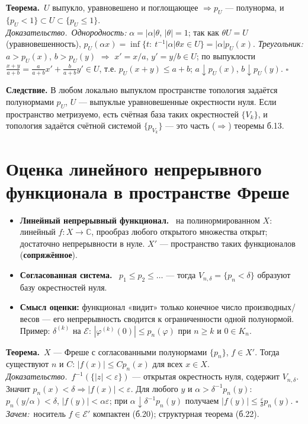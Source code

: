 \documentclass[11pt,a4paper]{article}
\newcommand{\CC}{\mathbb C}
\newcommand{\EE}{\mathcal E}
\newcommand{\df}[1]{\textbf{#1.}~}
\newcommand{\thm}{\textbf{Теорема.}~}
\newcommand{\pf}{\textit{Доказательство.}~}
\newcommand{\qedd}{\hfill$\square$}
\newcommand{\why}{\textit{Зачем:}~}
\begin{document}
\thm $U$ выпукло, уравновешено и поглощающее $\Rightarrow p_U$ — полунорма, и $\{p_U<1\}\subset U\subset\{p_U\le1\}$.\\
\pf \textit{Однородность:} $\alpha=|\alpha|\theta$, $|\theta|=1$; так как $\theta U=U$ (уравновешенность), $p_U(\alpha x)=\inf\{t:\ t^{-1}|\alpha|\theta x\in U\}=|\alpha|p_U(x)$. \textit{Треугольник:} $a>p_U(x)$, $b>p_U(y)$ $\Rightarrow$ $x'=x/a$, $y'=y/b\in U$; по выпуклости $\frac{x+y}{a+b}=\frac a{a+b}x'+\frac b{a+b}y'\in U$, т.е. $p_U(x+y)\le a+b$; $a\downarrow p_U(x)$, $b\downarrow p_U(y)$. \qedd

\textbf{Следствие.} В любом локально выпуклом пространстве топология задаётся полунормами $p_U$, $U$ — выпуклые уравновешенные окрестности нуля. Если пространство метризуемо, есть счётная база таких окрестностей $\{V_k\}$, и топология задаётся счётной системой $\{p_{V_k}\}$ — это часть ($\Rightarrow$) теоремы б.13.

\section{Оценка линейного непрерывного функционала в пространстве Фреше}
\begin{defs}
\begin{itemize}
\item \df{Линейный непрерывный функционал} на полинормированном $X$: линейный $f:X\to\CC$, прообраз любого открытого множества открыт; достаточно непрерывности в нуле. $X'$ — пространство таких функционалов (\textbf{сопряжённое}).
\item \df{Согласованная система} $p_1\le p_2\le\dots$ — тогда $V_{n,\delta}=\{p_n<\delta\}$ образуют базу окрестностей нуля.
\item \textbf{Смысл оценки:} функционал «видит» только конечное число производных/весов — его непрерывность сводится к ограниченности одной полунормой. Пример: $\delta^{(k)}$ на $\EE$: $|\varphi^{(k)}(0)|\le p_n(\varphi)$ при $n\ge k$ и $0\in K_n$.
\end{itemize}
\end{defs}

\thm $X$ — Фреше с согласованными полунормами $\{p_n\}$, $f\in X'$. Тогда существуют $n$ и $C$: $|f(x)|\le Cp_n(x)$ для всех $x\in X$.\\
\pf $f^{-1}(\{|z|<\varepsilon\})$ — открытая окрестность нуля, содержит $V_{n,\delta}$. Значит $p_n(x)<\delta\Rightarrow|f(x)|<\varepsilon$. Для любого $y$ и $\alpha>\delta^{-1}p_n(y)$: $p_n(y/\alpha)<\delta$, $|f(y)|<\alpha\varepsilon$; при $\alpha\downarrow\delta^{-1}p_n(y)$ получаем $|f(y)|\le\frac\varepsilon\delta p_n(y)$. \qedd\\
\why носитель $f\in\EE'$ компактен (б.20); структурная теорема (б.22).
\end{document}
